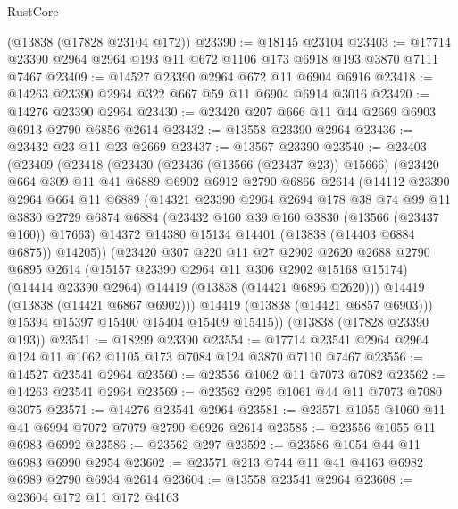 \begin{lexlean}{RustCore}
\begin{coremodule}
    (@13838 (@17828 @23104 @172))
@23390 := @18145 @23104
@23403 := @17714 @23390 @2964 @2964 @193 @11 @672 @1106 @173 @6918 @193 @3870 @7111 @7467
@23409 := @14527 @23390 @2964 @672 @11 @6904 @6916
@23418 := @14263 @23390 @2964 @322 @667 @59 @11 @6904 @6914 @3016
@23420 := @14276 @23390 @2964
@23430 := @23420 @207 @666 @11 @44 @2669 @6903 @6913 @2790 @6856 @2614
@23432 := @13558 @23390 @2964
@23436 := @23432 @23 @11 @23 @2669
@23437 := @13567 @23390
@23540 := @23403
    (@23409
      (@23418
        (@23430
          (@23436 (@13566 (@23437 @23)) @15666)
          (@23420
            @664
            @309
            @11
            @41
            @6889
            @6902
            @6912
            @2790
            @6866
            @2614
            (@14112
              @23390
              @2964
              @664
              @11
              @6889
              (@14321
                @23390
                @2964
                @2694
                @178
                @38
                @74
                @99
                @11
                @3830
                @2729
                @6874
                @6884
                (@23432 @160 @39 @160 @3830 (@13566 (@23437 @160)) @17663)
                @14372
                @14380
                @15134
                @14401
                (@13838 (@14403 @6884 @6875))
                @14205))
            (@23420
              @307
              @220
              @11
              @27
              @2902
              @2620
              @2688
              @2790
              @6895
              @2614
              (@15157 @23390 @2964 @11 @306 @2902 @15168 @15174)
              (@14414 @23390 @2964)
              @14419
              (@13838 (@14421 @6896 @2620)))
            @14419
            (@13838 (@14421 @6867 @6902)))
          @14419
          (@13838 (@14421 @6857 @6903)))
        @15394
        @15397
        @15400
        @15404
        @15409
        @15415))
    (@13838 (@17828 @23390 @193))
@23541 := @18299 @23390
@23554 := @17714 @23541 @2964 @2964 @124 @11 @1062 @1105 @173 @7084 @124 @3870 @7110 @7467
@23556 := @14527 @23541 @2964
@23560 := @23556 @1062 @11 @7073 @7082
@23562 := @14263 @23541 @2964
@23569 := @23562 @295 @1061 @44 @11 @7073 @7080 @3075
@23571 := @14276 @23541 @2964
@23581 := @23571 @1055 @1060 @11 @41 @6994 @7072 @7079 @2790 @6926 @2614
@23585 := @23556 @1055 @11 @6983 @6992
@23586 := @23562 @297
@23592 := @23586 @1054 @44 @11 @6983 @6990 @2954
@23602 := @23571 @213 @744 @11 @41 @4163 @6982 @6989 @2790 @6934 @2614
@23604 := @13558 @23541 @2964
@23608 := @23604 @172 @11 @172 @4163

\end{coremodule}
\end{lexlean}
